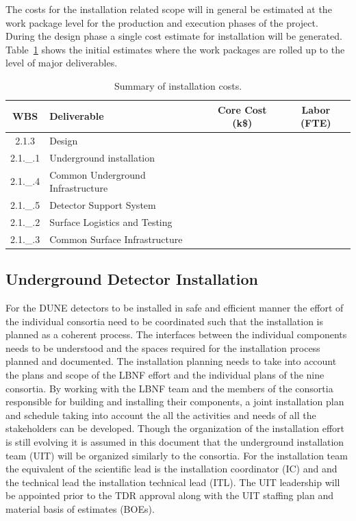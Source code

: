 The costs for the installation related scope will in general be
estimated at the work package level for the production and execution
phases of the project. During the design phase a single cost estimate
for installation will be generated. Table~\ref{Instal-Cost} shows the
initial estimates where the work packages are rolled up to the level
of major deliverables.
\begin{table}[h]
  \begin{center}
    \begin{tabular}{|c|l|c|c|}      \hline
      WBS&Deliverable&Core Cost (k\$)&Labor (FTE)\\      \hline \hline
      2.1.3&Design&&\\      \hline
      2.1.\_.1&Underground installation&&\\      \hline
      2.1.\_.4&Common Underground  Infrastructure&&\\      \hline
      2.1.\_.5& Detector Support System&&\\      \hline
      2.1.\_.2&Surface Logistics and Testing&&\\ \hline
      2.1.\_.3&Common Surface Infrastructure&&\\ \hline
    \end{tabular}
  \end{center}
  \caption{Summary of installation costs. }
  \label{Instal-Cost}
\end{table}




\subsection{Underground Detector Installation}
\label{sec:fdsp-coord-undergd}

For the DUNE detectors to be installed in safe and efficient manner
the effort of the individual consortia need to be coordinated such
that the installation is planned as a coherent process. The interfaces
between the individual components needs to be understood and the
spaces required for the installation process planned and
documented. The installation planning needs to take into account the
plans and scope of the LBNF effort and the individual plans of the
nine consortia. By working with the LBNF team and the members of the
consortia responsible for building and installing their components, a
joint installation plan and schedule taking into account the all the
activities and needs of all the stakeholders can be developed. Though
the organization of the installation effort is still evolving it is
assumed in this document that the underground installation team (UIT) will be organized
similarly to the consortia. For the installation team the equivalent
of the scientific lead is the installation coordinator (IC) and and
the technical lead the installation technical lead (ITL). The UIT
leadership will be appointed prior to the TDR approval along with the
UIT staffing plan and material basis of estimates (BOEs).

